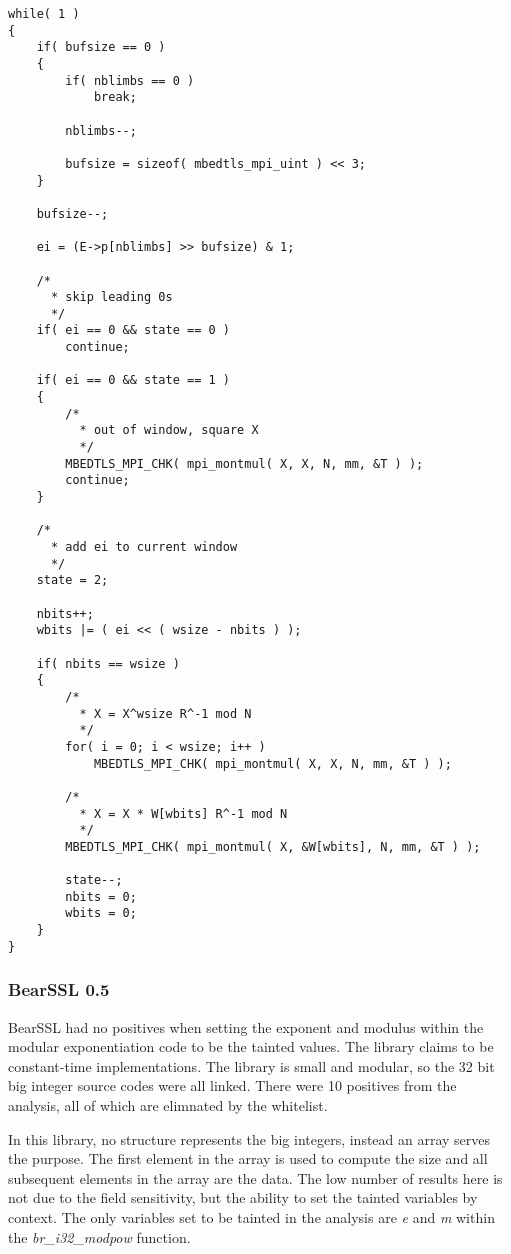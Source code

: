 \documentclass[11pt,a4paper]{article}
\newcommand{\codevar}[1]{\textit{#1}}
\newcommand{\codefn}[1]{\textit{#1}}
\newcommand{\ruleabove}{}
\newcommand{\rulebelow}{}
\begin{document}
\ruleabove
\begin{lstlisting}[caption=mbed TLS 2.9.0 - bignum.c lines 1717-1773]
while( 1 )
{
    if( bufsize == 0 )
    {
        if( nblimbs == 0 )
            break;

        nblimbs--;

        bufsize = sizeof( mbedtls_mpi_uint ) << 3;
    }

    bufsize--;

    ei = (E->p[nblimbs] >> bufsize) & 1;

    /*
      * skip leading 0s
      */
    if( ei == 0 && state == 0 )
        continue;

    if( ei == 0 && state == 1 )
    {
        /*
          * out of window, square X
          */
        MBEDTLS_MPI_CHK( mpi_montmul( X, X, N, mm, &T ) );
        continue;
    }

    /*
      * add ei to current window
      */
    state = 2;

    nbits++;
    wbits |= ( ei << ( wsize - nbits ) );

    if( nbits == wsize )
    {
        /*
          * X = X^wsize R^-1 mod N
          */
        for( i = 0; i < wsize; i++ )
            MBEDTLS_MPI_CHK( mpi_montmul( X, X, N, mm, &T ) );

        /*
          * X = X * W[wbits] R^-1 mod N
          */
        MBEDTLS_MPI_CHK( mpi_montmul( X, &W[wbits], N, mm, &T ) );

        state--;
        nbits = 0;
        wbits = 0;
    }
}
\end{lstlisting}
\rulebelow

\subsubsection{BearSSL 0.5}
  BearSSL had no positives when setting the exponent and modulus within the
  modular exponentiation code to be the tainted values. The library claims to be
  constant-time implementations. The library is small and modular, so the
  32 bit big integer source codes were all linked. There were 10 positives from
  the analysis, all of which are elimnated by the whitelist.
  
  In this library, no structure represents the big integers, instead an array
  serves the purpose. The first element in the array is used to compute the size
  and all subsequent elements in the array are the data. The low number of
  results here is not due to the field sensitivity, but the ability to set the
  tainted variables by context. The only variables set to be tainted in the
  analysis are \codevar{e} and \codevar{m} within the \codefn{br\_i32\_modpow} function.
\end{document}
